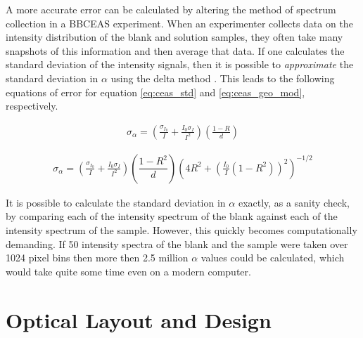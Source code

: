 A more accurate error can be calculated by altering the method of spectrum
collection in a \ac{BBCEAS} experiment. When an experimenter collects data
on the intensity distribution of the blank and solution samples, they often
take many snapshots of this information and then average that data. If one
calculates the standard deviation of the intensity signals, then it is
possible to \emph{approximate} the standard deviation in $\alpha$ using the
delta method \cite{Casella:2002tp}. This leads to the following equations
of error for equation \eqref{eq:ceas_std} and \eqref{eq:ceas_geo_mod},
respectively.

    \begin{align}
      \sigma_\alpha = \left(\frac{\sigma_{I_0}}{I} +
             \frac{I_0\sigma_I}{I^2}\right)
            \left(\frac{1-R}{d}\right)\label{eq:ceas_err_std}
    \end{align}


    \begin{align}
      \sigma_\alpha = \left(\frac{\sigma_{I_0}}{I} +
             \frac{I_0\sigma_I}{I^2}\right)
            \left(\dfrac{1-R^2}{d}\right)\left(4R^2+\left(
                                     \frac{I_0}{I}(1-R^2)\right)^2
                                     \right)^{-1/2}\label{eq:ceas_err_geo}
    \end{align}

It is possible to calculate the standard deviation in $\alpha$ exactly, as
a sanity check, by comparing each of the intensity spectrum of the blank
against each of the intensity spectrum of the sample. However, this quickly
becomes computationally demanding. If 50 intensity spectra of the blank and
the sample were taken over 1024 pixel bins then more then 2.5 million $\alpha$
values could be calculated, which would take quite some time even on a modern
computer.



\section{Optical Layout and Design}\label{sec:optical_layout}

